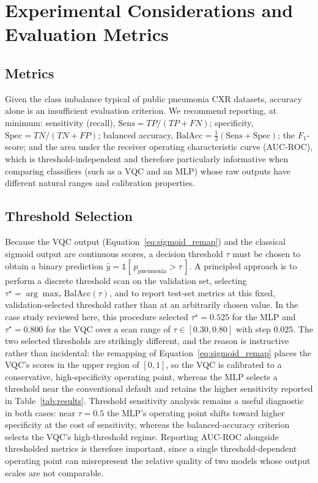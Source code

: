 \documentclass[11pt,a4paper]{article}
\begin{document}
\section{Experimental Considerations and Evaluation Metrics}
\label{sec:eval}

\subsection{Metrics}

Given the class imbalance typical of public pneumonia CXR datasets, accuracy
alone is an insufficient evaluation criterion.  We recommend reporting, at
minimum: sensitivity (recall), $\mathrm{Sens} = TP/(TP+FN)$; specificity,
$\mathrm{Spec} = TN/(TN+FP)$; balanced accuracy,
$\mathrm{BalAcc} = \tfrac{1}{2}(\mathrm{Sens}+\mathrm{Spec})$; the
$F_1$-score; and the area under the receiver operating characteristic curve
(AUC-ROC), which is threshold-independent and therefore particularly
informative when comparing classifiers (such as a VQC and an MLP) whose raw
outputs have different natural ranges and calibration properties.

\subsection{Threshold Selection}
\label{sec:threshold}

Because the VQC output (Equation~\ref{eq:sigmoid_remap}) and the classical
sigmoid output are continuous scores, a decision threshold $\tau$ must be
chosen to obtain a binary prediction
$\hat{y} = \mathbb{1}[\,p_{\text{pneumonia}} > \tau\,]$.  A principled
approach is to perform a discrete threshold scan on the validation set,
selecting $\tau^\star = \arg\max_\tau \mathrm{BalAcc}(\tau)$, and to report
test-set metrics at this fixed, validation-selected threshold rather than at
an arbitrarily chosen value.  In the case study reviewed here, this procedure
selected $\tau^\star = 0.525$ for the MLP and $\tau^\star = 0.800$ for the VQC
over a scan range of $\tau \in [0.30, 0.80]$ with step $0.025$.  The two
selected thresholds are strikingly different, and the reason is instructive
rather than incidental: the remapping of Equation~\ref{eq:sigmoid_remap}
places the VQC's scores in the upper region of $[0,1]$, so the VQC is
calibrated to a conservative, high-specificity operating point, whereas the
MLP selects a threshold near the conventional default and retains the higher
sensitivity reported in Table~\ref{tab:results}.  Threshold sensitivity
analysis remains a useful diagnostic in both cases: near $\tau = 0.5$ the
MLP's operating point shifts toward higher specificity at the cost of
sensitivity, whereas the balanced-accuracy criterion selects the VQC's
high-threshold regime.  Reporting AUC-ROC alongside thresholded metrics is
therefore important, since a single threshold-dependent operating point can
misrepresent the relative quality of two models whose output scales are not
comparable.
\end{document}
